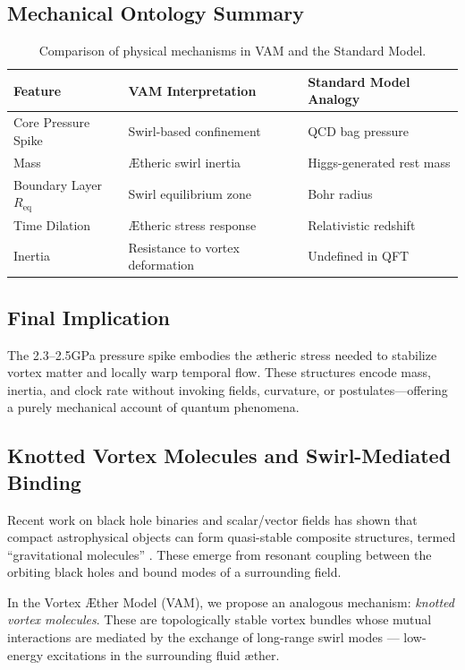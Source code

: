 \subsection{Mechanical Ontology Summary}

\begin{table}[H]
    \centering
    \begin{tabular}{|l|l|l|}
        \hline
        \textbf{Feature} & \textbf{VAM Interpretation} & \textbf{Standard Model Analogy} \\
        \hline
        Core Pressure Spike & Swirl-based confinement & QCD bag pressure \\
        Mass & Ætheric swirl inertia & Higgs-generated rest mass \\
        Boundary Layer \( R_{\text{eq}} \) & Swirl equilibrium zone & Bohr radius \\
        Time Dilation & Ætheric stress response & Relativistic redshift \\
        Inertia & Resistance to vortex deformation & Undefined in QFT \\
        \hline
    \end{tabular}
    \caption{Comparison of physical mechanisms in VAM and the Standard Model.}
\end{table}

\subsection*{Final Implication}

The 2.3–2.5GPa pressure spike embodies the ætheric stress needed to stabilize vortex matter and locally warp temporal flow. These structures encode mass, inertia, and clock rate without invoking fields, curvature, or postulates—offering a purely mechanical account of quantum phenomena.

\subsection{Knotted Vortex Molecules and Swirl-Mediated Binding}

Recent work on black hole binaries and scalar/vector fields has shown that compact astrophysical objects can form quasi-stable composite structures, termed ``gravitational molecules'' \cite{baumann2023black}. These emerge from resonant coupling between the orbiting black holes and bound modes of a surrounding field.

In the Vortex Æther Model (VAM), we propose an analogous mechanism: \textit{knotted vortex molecules}. These are topologically stable vortex bundles whose mutual interactions are mediated by the exchange of long-range swirl modes — low-energy excitations in the surrounding fluid æther.

